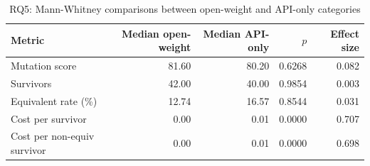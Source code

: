 \begin{table}[htbp]
\centering
{\small
\begin{tabular}{l|rrrr}
\toprule
\textbf{Metric} & \textbf{Median open-weight} & \textbf{Median API-only} & \textbf{$p$} & \textbf{Effect size} \\
\midrule
Mutation score & 81.60 & 80.20 & 0.6268 & 0.082 \\
Survivors & 42.00 & 40.00 & 0.9854 & 0.003 \\
Equivalent rate (\%) & 12.74 & 16.57 & 0.8544 & 0.031 \\
Cost per survivor & 0.00 & 0.01 & 0.0000 & 0.707 \\
Cost per non-equiv survivor & 0.00 & 0.01 & 0.0000 & 0.698 \\
\bottomrule
\end{tabular}
}
\caption{RQ5: Mann-Whitney comparisons between open-weight and API-only categories}
\label{tab:rq5-pairwise}
\end{table}